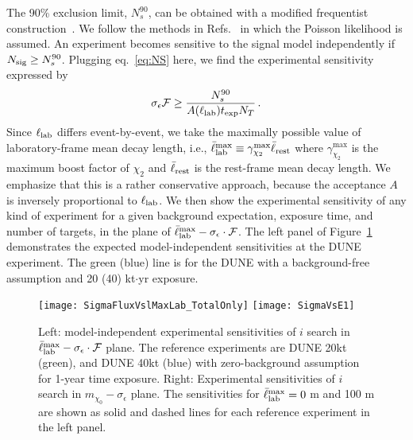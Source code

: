The 90\%  exclusion limit, $N_s^{90}$, can be obtained with a modified frequentist construction~\cite{cls1,cls2}. We follow the methods in Refs.~\cite{Dermisek:2013cxa,Dermisek:2014qca,Dermisek:2016via} in which the Poisson likelihood is assumed. 
An experiment becomes sensitive to the signal model independently if $N_{\rm sig} \ge N_s^{90}$.
Plugging eq.~\eqref{eq:NS} here, we find the experimental sensitivity expressed by %
\begin{align}
\sigma_\epsilon \mathcal F \ge \frac{N_s^{90}}{A(\ell_{\rm lab}) t_{\rm exp} N_T}\,. 
\label{eq:MIsensitivity}
\end{align}
Since $\ell_{\rm lab}$ differs event-by-event, we take the maximally possible value of laboratory-frame mean decay length, i.e., $\bar{\ell}_{\rm lab}^{\rm max} \equiv \gamma_{\chi_2}^{\max} \bar{\ell}_{\rm rest}$ where $\gamma_{\chi_2}^{\max}$ is the maximum boost factor of $\chi_2$ and $\bar{\ell}_{\rm rest}$ is the rest-frame mean decay length. 
We emphasize that this is a rather conservative approach, because the acceptance $A$ is inversely proportional to $\ell_{\rm lab}$.
We then show the experimental sensitivity of any kind of experiment for a given background expectation, exposure time, and number of targets, in the plane of $\bar{\ell}_{\rm lab}^{\rm max} - \sigma_\epsilon \cdot \mathcal F$. 
The left panel of Figure~\ref{fig:modelindependent} demonstrates the expected model-independent sensitivities at the DUNE experiment.
The green (blue) line is for the DUNE  with a background-free assumption and 20 (40) kt$\cdot$yr exposure.

\begin{figure}[t]
\centering
\texttt{[image: SigmaFluxVslMaxLab\_TotalOnly]}
\texttt{[image: SigmaVsE1]}
\caption[Model-independent experimental sensitivities of $i$BDM search]{
Left: model-independent experimental sensitivities of $i$ search in $\bar{\ell}_{\rm lab}^{\rm max} - \sigma_\epsilon \cdot \mathcal F$ plane. 
The reference experiments are
DUNE 20kt (green), and DUNE 40kt (blue) with zero-background assumption for 1-year time exposure. 
Right: Experimental sensitivities of $i$ search in $m_{\chi_0} - \sigma_\epsilon$ plane. The sensitivities for $\bar{\ell}_{\rm lab}^{\rm max} = 0$ m and 100 m are shown as solid and dashed lines for each reference experiment in the left panel.
\label{fig:modelindependent} }
\end{figure}

